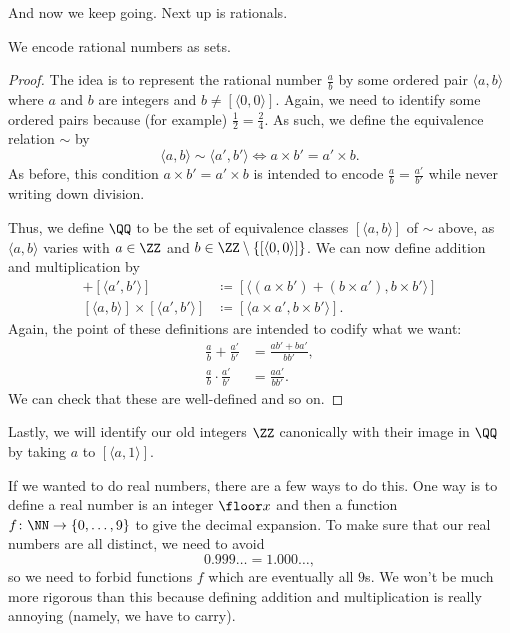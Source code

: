 And now we keep going. Next up is rationals.
\begin{exe}
	We encode rational numbers as sets.
\end{exe}
\begin{proof}
	The idea is to represent the rational number $\frac ab$ by some ordered pair $\langle a,b\rangle$ where $a$ and $b$ are integers and $b\ne[\langle0,0\rangle]$. Again, we need to identify some ordered pairs because (for example) $\frac12=\frac24$. As such, we define the equivalence relation $\sim$ by
	\[\langle a,b\rangle\sim\langle a',b'\rangle\iff a\times b'=a'\times b.\]
	As before, this condition $a\times b'=a'\times b$ is intended to encode $\frac ab=\frac{a'}{b'}$ while never writing down division.

	Thus, we define $\QQ$ to be the set of equivalence classes $[\langle a,b\rangle]$ of $\sim$ above, as $\langle a,b\rangle$ varies with $a\in\ZZ$ and $b\in\ZZ\setminus\{[\langle0,0\rangle]\}$. We can now define addition and multiplication by
	\begin{align*}
		[\langle a,b\rangle]+[\langle a',b'\rangle] &\coloneqq [\langle(a\times b')+(b\times a'),b\times b'\rangle] \\
		[\langle a,b\rangle]\times[\langle a',b'\rangle] &\coloneqq [\langle a\times a',b\times b'\rangle].
	\end{align*}
	Again, the point of these definitions are intended to codify what we want:
	\begin{align*}
		\frac ab+\frac{a'}{b'} &= \frac{ab'+ba'}{bb'}, \\
		\frac ab\cdot\frac{a'}{b'} &= \frac{aa'}{bb'}.
	\end{align*}
	We can check that these are well-defined and so on.
\end{proof}
\begin{remark}
	Lastly, we will identify our old integers $\ZZ$ canonically with their image in $\QQ$ by taking $a$ to $[\langle a,1\rangle]$.
\end{remark}
If we wanted to do real numbers, there are a few ways to do this. One way is to define a real number is an integer $\floor x$ and then a function $f\colon\NN\to\{0,\ldots,9\}$ to give the decimal expansion. To make sure that our real numbers are all distinct, we need to avoid
\[0.999\ldots=1.000\ldots,\]
so we need to forbid functions $f$ which are eventually all $9$s. We won't be much more rigorous than this because defining addition and multiplication is really annoying (namely, we have to carry).

